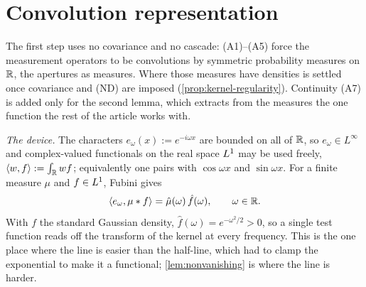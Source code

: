 %
%
%

\chapter{Convolution representation}
\label{ch:representation}

The first step uses no covariance and no cascade: (A1)--(A5) force the measurement operators
to be convolutions by symmetric probability measures on $\mathbb{R}$, the apertures as measures.
Where those measures have densities is settled once covariance and (ND) are imposed
(\ref{prop:kernel-regularity}). Continuity (A7) is added only for the second lemma, which
extracts from the measures the one function the rest of the article works with.

\emph{The device.} The characters $e_\omega(x) := e^{-i\omega x}$ are bounded on all of $\mathbb{R}$,
so $e_\omega \in L^\infty$ and complex-valued functionals on the real space $L^1$ may be used
freely, $\langle w, f\rangle := \int_{\mathbb{R}} w f$; equivalently one pairs with $\cos\omega x$ and
$\sin\omega x$. For a finite measure $\mu$ and $f \in L^1$, Fubini gives
\begin{equation}\label{eq:pairing}
  \langle e_\omega, \mu * f\rangle = \hat\mu(\omega)\,\hat f(\omega), \qquad \omega \in \mathbb{R} .
\end{equation}
With $f$ the standard Gaussian density, $\hat f(\omega) = e^{-\omega^2/2} > 0$, so a single
test function reads off the transform of the kernel at every frequency. This is the one place
where the line is easier than the half-line, which had to clamp the exponential to make it a
functional; \ref{lem:nonvanishing} is where the line is harder.

